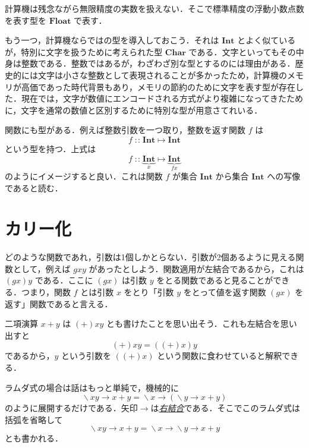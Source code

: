 \documentclass[a4paper]{jsbook}
\newcommand{\keyword}[1]{{\underline{\emph{#1}}}}
\newcommand{\mType}[1]{\mathbf{#1}}
\newcommand{\mCharType}{\mType{Char}}
\newcommand{\mIntType}{\mType{Int}}
\newcommand{\mFloatType}{\mType{Float}}
\DeclareMathOperator{\mLambda}{\backslash}
\DeclareMathOperator{\mLambdaArrow}{\rightarrow}
\DeclareMathOperator{\mIn}{{:\!:}}
\DeclareMathOperator{\mMapsTo}{\mapsto}
\newcommand{\mLambdaExp}[2]{\mLambda{#1}\mLambdaArrow{#2}}
\newcommand{\mProj}[2]{#1\mMapsTo#2}
\begin{document}
計算機は残念ながら無限精度の実数を扱えない．そこで標準精度の浮動小数点数を表す型を $\mFloatType$ で表す．

もう一つ，計算機ならではの型を導入しておこう．それは $\mIntType$ とよく似ているが，特別に文字を扱うために考えられた型 $\mCharType$ である．文字といってもその中身は整数である．整数ではあるが，わざわざ別な型とするのには理由がある．歴史的には文字は小さな整数として表現されることが多かったため，計算機のメモリが高価であった時代背景もあり，メモリの節約のために文字を表す型が存在した．現在では，文字が数値にエンコードされる方式がより複雑になってきたために，文字を通常の数値と区別するために特別な型が用意さてれいる．

関数にも型がある．例えば整数引数を一つ取り，整数を返す関数 $f$ は
\begin{equation}
f\mIn\mProj{\mIntType}{\mIntType}
\end{equation}
という型を持つ．上式は
\begin{equation}
f
\mIn\underbrace{\mIntType}_{x}
\mMapsTo
\underbrace{\mIntType}_{fx}
\end{equation}
のようにイメージすると良い．これは関数 $f$ が集合 $\mIntType$ から集合 $\mIntType$ への写像であると読む．

\section{カリー化}

どのような関数であれ，引数は1個しかとらない．引数が2個あるように見える関数として，例えば $gxy$ があったとしよう．関数適用が左結合であるから，これは $\left(gx\right)y$ である．ここに $\left(gx\right)$ は引数 $y$ をとる関数であると見ることができる．つまり，関数 $f$ とは引数 $x$ をとり「引数 $y$ をとって値を返す関数 $\left(gx\right)$ を返す」関数であると言える．

二項演算 $x+y$ は $(+)xy$ とも書けたことを思い出そう．これも左結合を思い出すと
\begin{equation}
(+)xy=\left((+)x\right)y
\end{equation}
であるから，$y$ という引数を $\left((+)x\right)$ という関数に食わせていると解釈できる．

ラムダ式の場合は話はもっと単純で，機械的に
\begin{equation}
\mLambdaExp{xy}{x+y}
=\mLambdaExp{x}{\left(\mLambdaExp{y}{x+y}\right)}
\end{equation}
のように展開するだけである．矢印$\mLambdaArrow$は\keyword{右結合}である．そこでこのラムダ式は括弧を省略して
\begin{equation}
\mLambdaExp{xy}{x+y}
=\mLambdaExp{x}{\mLambdaExp{y}{x+y}}
\end{equation}
とも書かれる．
\end{document}
